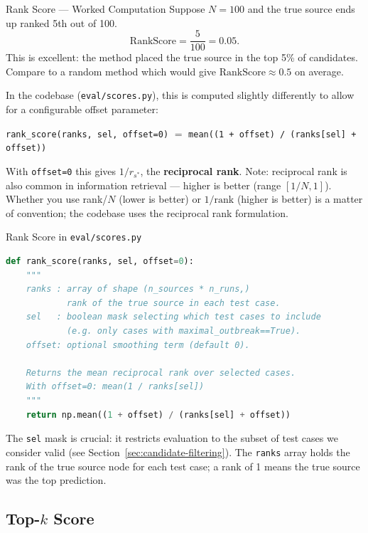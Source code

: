 \begin{examplebox}{Rank Score — Worked Computation}
Suppose $N = 100$ and the true source ends up ranked 5th out of 100.
\[
    \text{RankScore} = \frac{5}{100} = 0.05.
\]
This is excellent: the method placed the true source in the top 5\% of
candidates. Compare to a random method which would give
$\text{RankScore} \approx 0.5$ on average.

In the codebase (\texttt{eval/scores.py}), this is computed slightly
differently to allow for a configurable offset parameter:
\begin{center}
\texttt{rank\_score(ranks, sel, offset=0)} $=$ \texttt{mean((1 + offset) / (ranks[sel] + offset))}
\end{center}
With \texttt{offset=0} this gives $1/r_{s^*}$, the \textbf{reciprocal rank}.
Note: reciprocal rank is also common in information retrieval — higher is
better (range $[1/N, 1]$). Whether you use rank/$N$ (lower is better) or
$1/\text{rank}$ (higher is better) is a matter of convention; the codebase
uses the reciprocal rank formulation.
\end{examplebox}

\begin{codewalk}{Rank Score in \texttt{eval/scores.py}}
\begin{lstlisting}[language=Python]
def rank_score(ranks, sel, offset=0):
    """
    ranks : array of shape (n_sources * n_runs,)
            rank of the true source in each test case.
    sel   : boolean mask selecting which test cases to include
            (e.g. only cases with maximal_outbreak==True).
    offset: optional smoothing term (default 0).

    Returns the mean reciprocal rank over selected cases.
    With offset=0: mean(1 / ranks[sel])
    """
    return np.mean((1 + offset) / (ranks[sel] + offset))
\end{lstlisting}

The \texttt{sel} mask is crucial: it restricts evaluation to the subset of
test cases we consider valid (see Section~\ref{sec:candidate-filtering}).
The \texttt{ranks} array holds the rank of the true source node for each
test case; a rank of 1 means the true source was the top prediction.
\end{codewalk}

\subsection{Top-$k$ Score}

